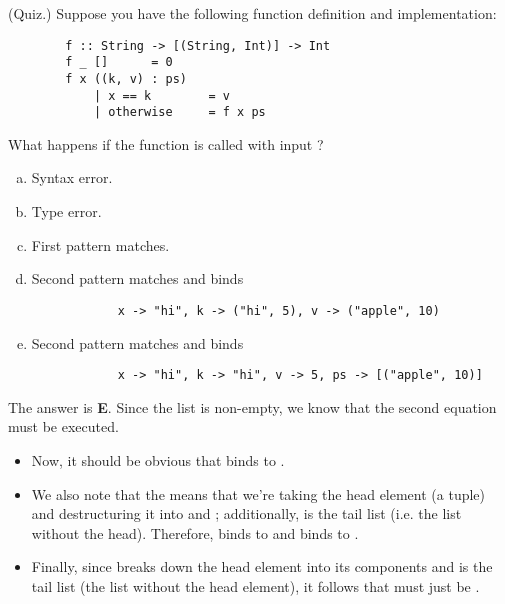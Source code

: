\documentclass[letterpaper]{article}
\begin{document}
\begin{mdframed}[]
    (Quiz.) Suppose you have the following function definition and implementation: 
    \begin{verbatim}
        f :: String -> [(String, Int)] -> Int 
        f _ []      = 0
        f x ((k, v) : ps)
            | x == k        = v
            | otherwise     = f x ps \end{verbatim}
    What happens if the function is called with input ?
    \begin{enumerate}[(a)]
        \item Syntax error. 
        \item Type error. 
        \item First pattern matches. 
        \item Second pattern matches and binds
        \begin{verbatim}
            x -> "hi", k -> ("hi", 5), v -> ("apple", 10)\end{verbatim}
        \item Second pattern matches and binds 
        \begin{verbatim}
            x -> "hi", k -> "hi", v -> 5, ps -> [("apple", 10)]\end{verbatim}
    \end{enumerate}

    \begin{mdframed}[]
        The answer is \textbf{E}. Since the list is non-empty, we know that the second equation must be executed. 
        \begin{itemize}
            \item Now, it should be obvious that  binds to . 
            \item We also note that the  means that we're taking the head element (a tuple) and destructuring it into  and ; additionally,  is the tail list (i.e. the list without the head). Therefore,  binds to  and  binds to .
            \item Finally, since  breaks down the head element into its components and  is the tail list (the list without the head element), it follows that  must just be \code{[("apple", 10)]}. 
        \end{itemize}
    \end{mdframed}
\end{mdframed}
\end{document}
